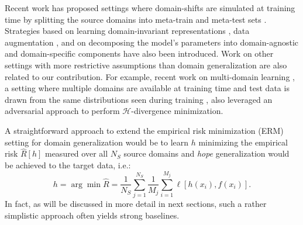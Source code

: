 \documentclass{article}
\begin{document}
Recent work has proposed settings where domain-shifts are simulated at training time by splitting the source domains into meta-train and meta-test sets \cite{li2018learning,balaji2018metareg,dou2019domain,li2019episodic}. Strategies based on learning domain-invariant representations \cite{muandet2013domain}, data augmentation \cite{volpi2018generalizing,shankar2018generalizing}, and on decomposing the model's parameters into domain-agnostic and domain-specific components \cite{li2017deeper} have also been introduced. Work on other settings with more restrictive assumptions than domain generalization are also related to our contribution. For example, recent work on multi-domain learning \cite{schoenauer2019multi}, a setting where multiple domains are available at training time and test data is drawn from the same distributions seen during training \cite{dredze2010multi}, also leveraged an adversarial approach to perform $\mathcal{H}$-divergence minimization.



A straightforward approach to extend the empirical risk minimization (ERM) setting for domain generalization would be to learn $h$ minimizing the empirical risk $\hat{R}[h]$ measured over all $N_S$ source domains and \textit{hope} generalization would be achieved to the target data, i.e.:
\begin{equation}\label{ERM}
     h = \arg \min \hat{R} = \frac{1}{N_S} \sum_{j=1}^{N_S}\frac{1}{M_j}\sum\limits_{i=1}^{M_j} \ell[h(x_i),f(x_i)].
\end{equation}
In fact, as will be discussed in more detail in next sections, such a rather simplistic approach often yields strong baselines.
\end{document}
